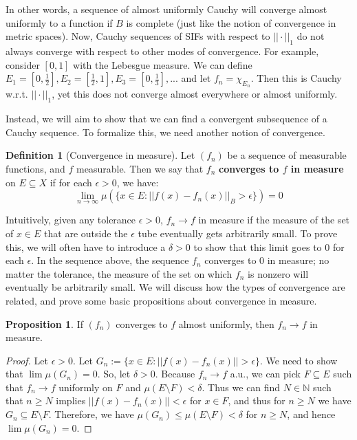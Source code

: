 \documentclass[11pt, oneside]{amsart}   	%
\theoremstyle{definition}
\newtheorem{definition}{Definition}[section]
\newtheorem{prop}{Proposition}[section]
\begin{document}
	In other words, a sequence of almost uniformly Cauchy will converge almost uniformly to a function if $B$ is complete 
	(just like the notion of convergence in metric spaces). Now, Cauchy sequences of SIFs with respect to $||\cdot||_1$ do 
	not always converge with respect to other modes of convergence. For example, consider $[0, 1]$ with the Lebesgue 
	measure. We can define $E_1 = [0, \frac{1}{2}], E_2 = [\frac{1}{2}, 1], E_3 = [0, \frac{1}{3}], ...$ and let 
	$f_n = \chi_{E_n}$. Then this is Cauchy w.r.t. $||\cdot||_1$, yet this does not converge almost everywhere or almost 
	uniformly.
	
	Instead, we will aim to show that we can find a convergent subsequence of a Cauchy sequence. To formalize this, we 
	need another notion of convergence. 
	
	\begin{definition}[Convergence in measure]
		Let $(f_n)$ be a sequence of measurable functions, and $f$ measurable. Then we say that $f_n$ \textbf{converges 
		to $f$ in measure} on $E\subseteq X$ if for each $\epsilon > 0$, we have:
		$$
			\lim_{n\rightarrow\infty}\mu(\{x\in E : ||f(x) - f_n(x)||_B > \epsilon\}) = 0
		$$
	\end{definition}
	
	Intuitively, given any tolerance $\epsilon > 0$, $f_n\rightarrow f$ in measure if the measure of the set of $x\in E$ that are 
	outside the $\epsilon$ tube eventually gets arbitrarily small. To prove this, we will often have to introduce a $\delta > 0$ 
	to show that this limit goes to 0 for each $\epsilon$. In the sequence above, the sequence $f_n$ converges to 0 in 
	measure; no matter the tolerance, the measure of the set on which $f_n$ is nonzero will eventually be arbitrarily 
	small. We will discuss how the types of convergence are related, and prove some basic propositions about convergence 
	in measure.
	
	\begin{prop}
		If $(f_n)$ converges to $f$ almost uniformly, then $f_n\rightarrow f$ in measure. 
	\end{prop}
	
	\begin{proof}
		Let $\epsilon > 0$. Let $G_n := \{x\in E : ||f(x) - f_n(x)|| > \epsilon\}$. We need to show that $\lim\mu(G_n) = 0$. 
		So, let $\delta > 0$. Because $f_n\rightarrow f$ a.u., we can pick $F\subseteq E$ such that $f_n\rightarrow f$ 
		uniformly on $F$ and $\mu(E\setminus F) < \delta$. Thus we can find $N\in\mathbb N$ such that $n\geq N$ 
		implies $||f(x) - f_n(x)|| < \epsilon$ for $x\in F$, and thus for $n\geq N$ we have $G_n\subseteq E\setminus F$. 
		Therefore, we have $\mu(G_n) \leq\mu(E\setminus F) < \delta$ for $n\geq N$, and hence $\lim\mu(G_n) = 0$.
	\end{proof}
	
\end{document}
